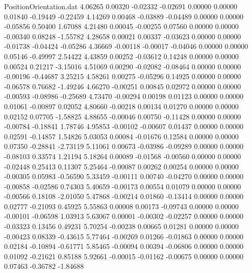 \begin{filecontents}{PositionOrientation.dat}
   4.06265    0.00320   -0.02332    -0.02691    0.00000    0.00000    0.01840   -0.19449   -0.22459
   4.14269    0.00468   -0.03889    -0.04489    0.00000    0.00000   -0.05856    0.50400    1.67088
   4.21480    0.00045   -0.00255     0.07560    0.00000    0.00000   -0.00340    0.08248   -1.55782
   4.28658    0.00021    0.00337    -0.03623    0.00000    0.00000   -0.01738   -0.04424   -0.05286
   4.36669   -0.00118   -0.00017    -0.04046    0.00000    0.00000    0.05146   -0.49997    2.54422
   4.43859    0.00252   -0.03612     0.14248    0.00000    0.00000    0.00524    0.21217   -3.15016
   4.51069    0.00290   -0.02082    -0.08464    0.00000    0.00000   -0.00196   -0.44687    3.25215
   4.58261    0.00275   -0.05296     0.14925    0.00000    0.00000   -0.06578    0.76682   -1.49246
   4.66270   -0.00251    0.00845     0.02972    0.00000    0.00000   -0.00593   -0.08986   -0.25689
   4.73470   -0.00294    0.00198     0.01123    0.00000    0.00000    0.01061   -0.00897    0.02052
   4.80660   -0.00218    0.00134     0.01270    0.00000    0.00000    0.02152    0.07705   -1.58825
   4.88655   -0.00046    0.00750    -0.11428    0.00000    0.00000   -0.00784   -0.18841    1.78746
   4.95853   -0.00102   -0.00607     0.01437    0.00000    0.00000    0.02591   -0.14857    1.54826
   5.03053    0.00084   -0.01676     0.12584    0.00000    0.00000    0.07350   -0.28841   -2.73119
   5.11061    0.00673   -0.03986    -0.09289    0.00000    0.00000   -0.08103    0.33574    1.21194
   5.18264    0.00089   -0.01568    -0.00560    0.00000    0.00000   -0.02448    0.25413    0.11307
   5.25464   -0.00087    0.00262     0.00254    0.00000    0.00000   -0.00305    0.05983   -0.56590
   5.33459   -0.00111    0.00740    -0.04270    0.00000    0.00000   -0.00858   -0.02586    0.74303
   5.40659   -0.00173    0.00554     0.01079    0.00000    0.00000   -0.00566    0.18108   -2.01050
   5.47868   -0.00214    0.01860    -0.13414    0.00000    0.00000    0.02777   -0.21093    0.45925
   5.55863    0.00008    0.00173    -0.09743    0.00000    0.00000   -0.00101   -0.06598    1.03913
   5.63067    0.00001   -0.00302    -0.02257    0.00000    0.00000   -0.03323    0.13456    0.49231
   5.70254   -0.00238    0.00665     0.01281    0.00000    0.00000   -0.00423    0.08339   -0.43615
   5.77464   -0.00269    0.01266    -0.01863    0.00000    0.00000    0.02184   -0.10894   -0.61771
   5.85465   -0.00094    0.00394    -0.06806    0.00000    0.00000    0.01092   -0.21621    0.85188
   5.92661   -0.00015   -0.01162    -0.00675    0.00000    0.00000    0.07463   -0.36782   -1.84688

\end{filecontents}
